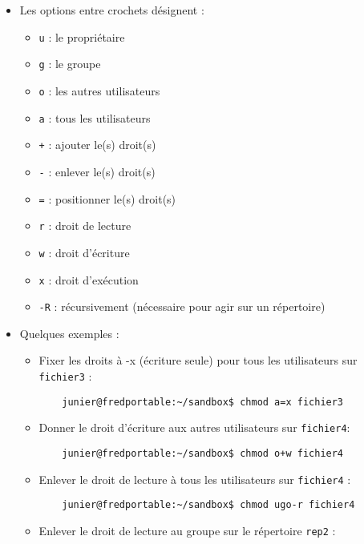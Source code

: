 \documentclass[
  11pt,
]{article}
\providecommand{\tightlist}{%
  \setlength{\itemsep}{0pt}\setlength{\parskip}{0pt}}
\newcounter{prop}
\begin{document}
\begin{enumerate}
  \begin{itemize}
  \tightlist
  \item
    Les options entre crochets désignent :

    \begin{itemize}
    \tightlist
    \item
      \texttt{u} : le propriétaire
    \item
      \texttt{g} : le groupe
    \item
      \texttt{o} : les autres utilisateurs
    \item
      \texttt{a} : tous les utilisateurs
    \item
      \texttt{+} : ajouter le(s) droit(s)
    \item
      \texttt{-} : enlever le(s) droit(s)
    \item
      \texttt{=} : positionner le(s) droit(s)
    \item
      \texttt{r} : droit de lecture
    \item
      \texttt{w} : droit d'écriture
    \item
      \texttt{x} : droit d'exécution
    \item
      \texttt{-R} : récursivement (nécessaire pour agir sur un
      répertoire)
    \end{itemize}
  \item
    Quelques exemples :

    \begin{itemize}
    \item
      Fixer les droits à -x (écriture seule) pour tous les utilisateurs
      sur \texttt{fichier3} :

\begin{verbatim}
    junier@fredportable:~/sandbox$ chmod a=x fichier3
\end{verbatim}
    \item
      Donner le droit d'écriture aux autres utilisateurs sur
      \texttt{fichier4}:

\begin{verbatim}
    junier@fredportable:~/sandbox$ chmod o+w fichier4
\end{verbatim}
    \item
      Enlever le droit de lecture à tous les utilisateurs sur
      \texttt{fichier4} :

\begin{verbatim}
    junier@fredportable:~/sandbox$ chmod ugo-r fichier4
\end{verbatim}
    \item
      Enlever le droit de lecture au groupe sur le répertoire
      \texttt{rep2} :


\end{itemize}
\end{itemize}
\end{enumerate}
\end{document}

